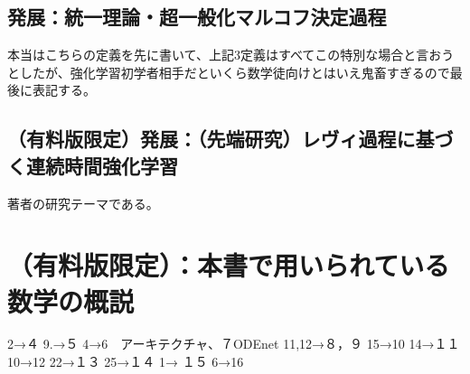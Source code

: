 \documentclass{jsarticle}
\begin{document}
\subsection{発展：統一理論・超一般化マルコフ決定過程}
本当はこちらの定義を先に書いて、上記3定義はすべてこの特別な場合と言おうとしたが、強化学習初学者相手だといくら数学徒向けとはいえ鬼畜すぎるので最後に表記する。


\subsection{（有料版限定）発展：（先端研究）レヴィ過程に基づく連続時間強化学習}
著者の研究テーマである。

\newpage
\section{（有料版限定）：本書で用いられている数学の概説}
2→４
9.→５
4→6　アーキテクチャ、７ODEnet
11,12→８，９
15→10
14→１１
10→12
22→１３
25→１４
1→  １５
6→16
\newpage
\end{document}
